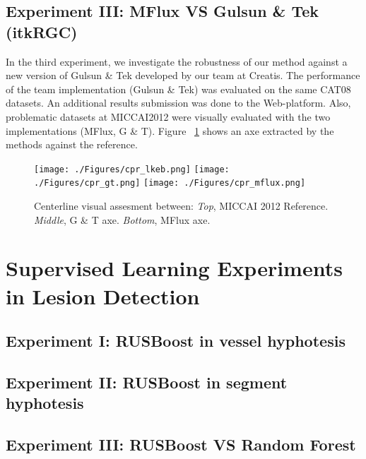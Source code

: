 \subsection{Experiment III: MFlux VS Gulsun \& Tek (itkRGC)}

In the third experiment, we investigate the robustness of our method against a new version of Gulsun \& Tek developed by our team at Creatis. The performance of the team implementation (Gulsun \& Tek) was evaluated on the same CAT08 datasets. An additional results submission was done to the Web-platform. Also, problematic datasets at MICCAI2012 were visually evaluated with the two implementations (MFlux, G \& T). Figure ~\ref{fig:exp3_cpr} shows an axe extracted by the methods against the reference.

\begin{figure}[htbp]
	\centering
		\texttt{[image: ./Figures/cpr\_lkeb.png]}
		\texttt{[image: ./Figures/cpr\_gt.png]}
		\texttt{[image: ./Figures/cpr\_mflux.png]}
	\caption[Centerline Comparison]{Centerline visual assesment between: \textit{Top}, MICCAI 2012 Reference. \textit{Middle}, G \& T axe. \textit{Bottom}, MFlux axe.}
	\label{fig:exp3_cpr}
\end{figure}

\section{Supervised Learning Experiments in Lesion Detection}

\subsection{Experiment I: RUSBoost in vessel hyphotesis}

\subsection{Experiment II: RUSBoost in segment hyphotesis}

\subsection{Experiment III: RUSBoost VS Random Forest}

